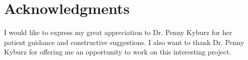 \chapter*{Acknowledgments}
I would like to express my great appreciation to Dr. Penny Kyburz for her patient guidance and constructive suggestions. I also want to thank Dr. Penny Kyburz for offering me an opportunity to work on this interesting project.

